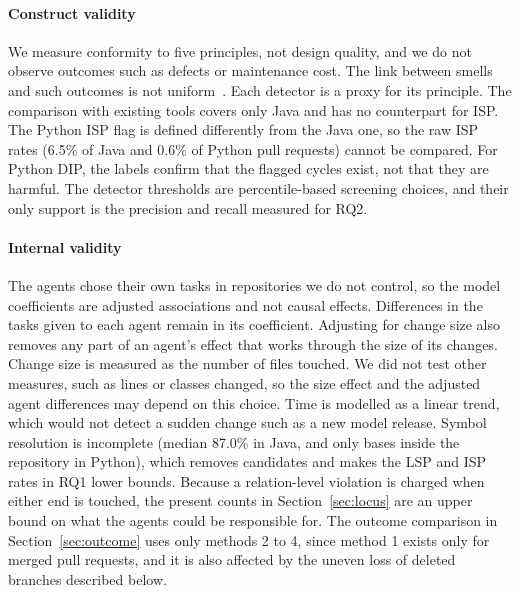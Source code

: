 \documentclass[sigconf]{acmart}
\begin{document}
\paragraph{Construct validity} We measure conformity to five principles, not design quality, and we
do not observe outcomes such as defects or maintenance cost. The link between smells and such
outcomes is not uniform~\cite{olbrich2010godclass}. Each detector is a proxy for its principle. The
comparison with existing tools covers only Java and has no counterpart for ISP. The Python ISP flag is defined differently from the Java one, so the raw ISP rates (6.5\% of Java and
0.6\% of Python pull requests) cannot be compared. For Python DIP, the labels confirm that the
flagged cycles exist, not that they are harmful. The detector thresholds are percentile-based
screening choices, and their only support is the precision and recall measured for RQ2.

\paragraph{Internal validity} The agents chose their own tasks in repositories we do not control, so
the model coefficients are adjusted associations and not causal effects. Differences in the tasks
given to each agent remain in its coefficient. Adjusting for change size also removes any part of an
agent's effect that works through the size of its changes. Change size is measured as the number of
files touched. We did not test other measures, such as lines or classes changed, so the size effect
and the adjusted agent differences may depend on this choice. Time is modelled as a linear trend,
which would not detect a sudden change such as a new model release. Symbol resolution is incomplete (median
87.0\% in Java, and only bases inside the repository in Python), which removes candidates and makes
the LSP and ISP rates in RQ1 lower bounds. Because a relation-level violation is charged when
either end is touched, the present counts in Section~\ref{sec:locus} are an upper bound on what the agents could be
responsible for. The outcome comparison in Section~\ref{sec:outcome} uses only methods 2 to 4, since method 1 exists only
for merged pull requests, and it is also affected by the uneven loss of deleted branches described
below.
\end{document}
